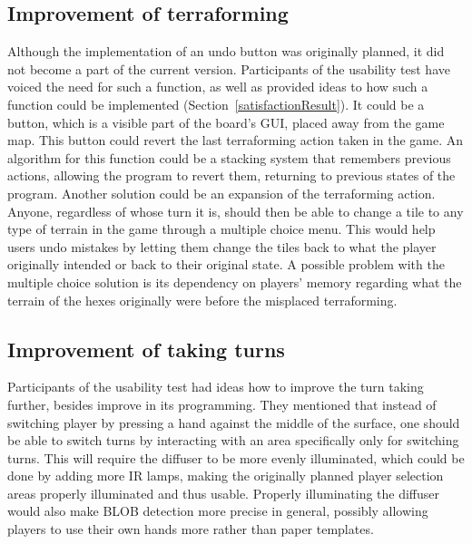 \subsection{Improvement of terraforming}
Although the implementation of an undo button was originally planned, it did not become a part of the current version. Participants of the usability test have voiced the need for such a function, as well as provided ideas to how such a function could be implemented (Section~\ref{satisfactionResult}). It could be a button, which is a visible part of the board's GUI, placed away from the game map. This button could revert the last terraforming action taken in the game. An algorithm for this function could be a stacking system that remembers previous actions, allowing the program to revert them, returning to previous states of the program. Another solution could be an expansion of the terraforming action. Anyone, regardless of whose turn it is, should then be able to change a tile to any type of terrain in the game through a multiple choice menu. This would help users undo mistakes by letting them change the tiles back to what the player originally intended or back to their original state. A possible problem with the multiple choice solution is its dependency on players' memory regarding what the terrain of the hexes originally were before the misplaced terraforming. 

\subsection{Improvement of taking turns}
Participants of the usability test had ideas how to improve the turn taking further, besides improve in its programming. They mentioned that instead of switching player by pressing a hand against the middle of the surface, one should be able to switch turns by interacting with an area specifically only for switching turns. This will require the diffuser to be more evenly illuminated, which could be done by adding more IR lamps, making the originally planned player selection areas properly illuminated and thus usable. Properly illuminating the diffuser would also make BLOB detection more precise in general, possibly allowing players to use their own hands more rather than paper templates.

